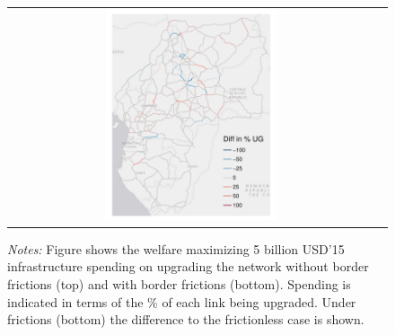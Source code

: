 \documentclass[a4paper]{article}
\begin{document}
\begin{figure}[h!]
{\begin{tabular}{cc}
\includegraphics[width=0.48\textwidth]{"../figures/GE/trans_africa_network_GE_20g_5b_fixed_cgc_sigma3.8_rho2_julia_google_Ijk_bc_perc_ug_diff.pdf"}
\end{tabular}
}
\scriptsize 
\emph{Notes:} Figure shows the welfare maximizing 5 billion USD'15 infrastructure spending on upgrading the network without border frictions (top) and with border frictions (bottom). Spending is indicated in terms of the \% of each link being upgraded. Under frictions (bottom) the difference to the frictionless case is shown.   
\end{figure}
\end{document}
